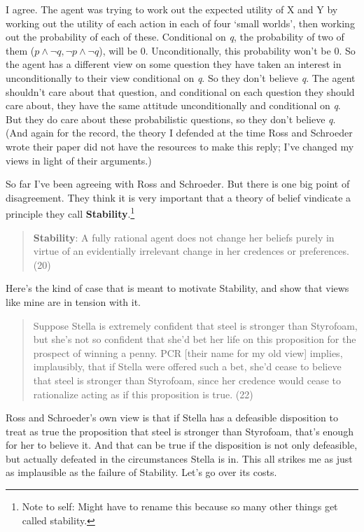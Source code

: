 \documentclass[11pt,]{book}
\let\rmarkdownfootnote\footnote%
\def\footnote{\protect\rmarkdownfootnote}
\begin{document}
I agree. The agent was trying to work out the expected utility of X and Y by working out the utility of each action in each of four `small worlds', then working out the probability of each of these. Conditional on \emph{q}, the probability of two of them (\(p \wedge \neg q, \neg p \wedge \neg q\)), will be 0. Unconditionally, this probability won't be 0. So the agent has a different view on some question they have taken an interest in unconditionally to their view conditional on \emph{q}. So they don't believe \emph{q}. The agent shouldn't care about that question, and conditional on each question they should care about, they have the same attitude unconditionally and conditional on \emph{q}. But they do care about these probabilistic questions, so they don't believe \emph{q}. (And again for the record, the theory I defended at the time Ross and Schroeder wrote their paper did not have the resources to make this reply; I've changed my views in light of their arguments.)

So far I've been agreeing with Ross and Schroeder. But there is one big point of disagreement. They think it is very important that a theory of belief vindicate a principle they call \textbf{Stability}.\footnote{Note to self: Might have to rename this because so many other things get called stability.}

\begin{quote}
\textbf{Stability}: A fully rational agent does not change her beliefs purely in virtue of an evidentially irrelevant change in her credences or preferences. (20)
\end{quote}

Here's the kind of case that is meant to motivate Stability, and show
that views like mine are in tension with it.

\begin{quote}
Suppose Stella is extremely confident that steel is stronger than Styrofoam, but she's not so confident that she'd bet her life on this proposition for the prospect of winning a penny. PCR {[}their name for my old view{]} implies, implausibly, that if Stella were offered such a bet, she'd cease to believe that steel is stronger than Styrofoam, since her credence would cease to rationalize acting as if this proposition is true. (22)
\end{quote}

Ross and Schroeder's own view is that if Stella has a defeasible disposition to treat as true the proposition that steel is stronger than Styrofoam, that's enough for her to believe it. And that can be true if the disposition is not only defeasible, but actually defeated in the circumstances Stella is in. This all strikes me as just as implausible as the failure of Stability. Let's go over its costs.
\end{document}
